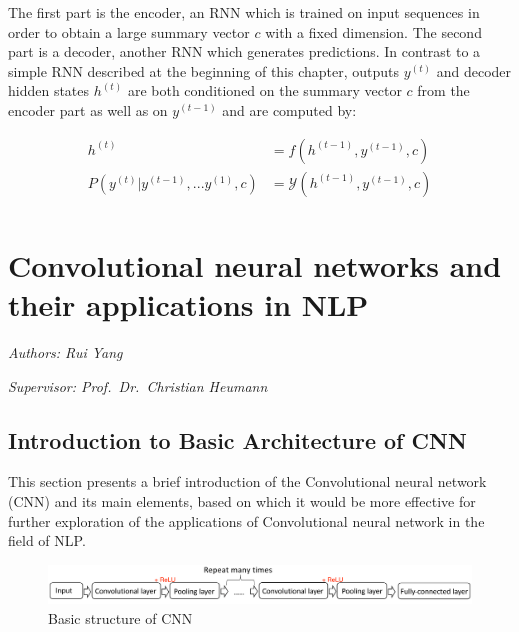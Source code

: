 \documentclass[]{krantz}
\begin{document}
The first part is the encoder, an RNN which is trained on input sequences in order to obtain a large summary vector \(c\) with a fixed dimension. The second part is a decoder, another RNN which generates predictions. In contrast to a simple RNN described at the beginning of this chapter, outputs \(y^{(t)}\) and decoder hidden states \(h^{(t)}\) are both conditioned on the summary vector \(c\) from the encoder part as well as on \(y^{(t-1)}\) and are computed by:

\begin{align}
h^{(t)} & = f(h^{(t-1)},y^{(t-1)},c) \label{eq:decoder-hidden} \\
P(y^{(t)}|y^{(t-1)},...y^{(1)},c) & = \mathcal{Y}(h^{(t-1)},y^{(t-1)},c) \label{eq:decoder-output} \\
\end{align}

\hypertarget{convolutional-neural-networks-and-their-applications-in-nlp}{%
\chapter{Convolutional neural networks and their applications in NLP}\label{convolutional-neural-networks-and-their-applications-in-nlp}}

\emph{Authors: Rui Yang}

\emph{Supervisor: Prof.~Dr.~Christian Heumann}

\hypertarget{introduction-to-basic-architecture-of-cnn}{%
\section{Introduction to Basic Architecture of CNN}\label{introduction-to-basic-architecture-of-cnn}}

This section presents a brief introduction of the Convolutional neural network (CNN) and its main elements, based on which it would be more effective for further exploration of the applications of Convolutional neural network in the field of NLP.

\begin{figure}[ht]
\includegraphics[width=1.05\linewidth]{figures/01-03-cnns-and-their-applications-in-nlp/basic_structure} \caption{Basic structure of CNN}\label{fig:figs}
\end{figure}
\end{document}
